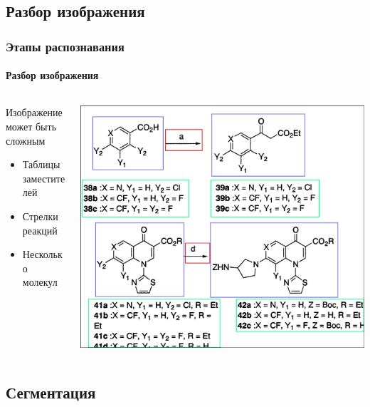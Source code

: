 \subsection{Разбор изображения}

\begin{frame}
   \frametitle{Этапы распознавания}
   \framesubtitle{Разбор изображения}
   \begin{columns}
     \begin{column}{0.4\textwidth}
      Изображение может быть сложным
      \begin{itemize}
        \item Таблицы заместителей
        \item Стрелки реакций
        \item Несколько молекул
      \end{itemize}
 \end{column}
 \begin{column}{0.6\textwidth}
   \includegraphics[scale=0.4]{media/superseg.png}
 \end{column}
 \end{columns}
\end{frame}

\subsection{Сегментация}

